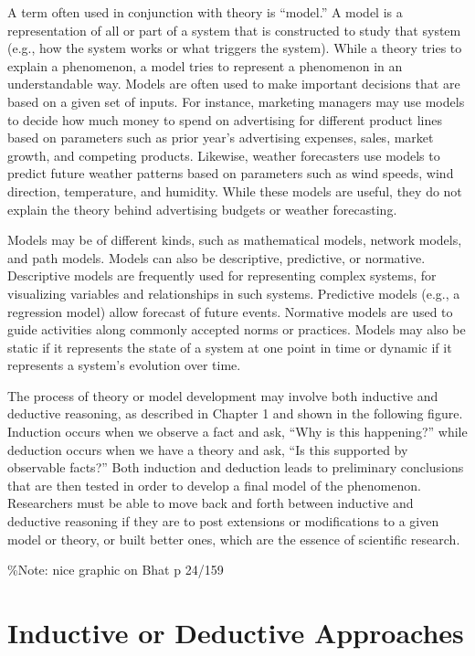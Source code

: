 \documentclass[]{book}
\theoremstyle{definition}
\theoremstyle{definition}
\theoremstyle{definition}
\theoremstyle{remark}
\begin{document}
A term often used in conjunction with theory is ``model.'' A model is a
representation of all or part of a system that is constructed to study
that system (e.g., how the system works or what triggers the system).
While a theory tries to explain a phenomenon, a model tries to represent
a phenomenon in an understandable way. Models are often used to make
important decisions that are based on a given set of inputs. For
instance, marketing managers may use models to decide how much money to
spend on advertising for different product lines based on parameters
such as prior year's advertising expenses, sales, market growth, and
competing products. Likewise, weather forecasters use models to predict
future weather patterns based on parameters such as wind speeds, wind
direction, temperature, and humidity. While these models are useful,
they do not explain the theory behind advertising budgets or weather
forecasting.

Models may be of different kinds, such as mathematical models, network
models, and path models. Models can also be descriptive, predictive, or
normative. Descriptive models are frequently used for representing
complex systems, for visualizing variables and relationships in such
systems. Predictive models (e.g., a regression model) allow forecast of
future events. Normative models are used to guide activities along
commonly accepted norms or practices. Models may also be static if it
represents the state of a system at one point in time or dynamic if it
represents a system's evolution over time.

The process of theory or model development may involve both inductive
and deductive reasoning, as described in Chapter 1 and shown in the
following figure. Induction occurs when we observe a fact and ask, ``Why
is this happening?'' while deduction occurs when we have a theory and
ask, ``Is this supported by observable facts?'' Both induction and
deduction leads to preliminary conclusions that are then tested in order
to develop a final model of the phenomenon. Researchers must be able to
move back and forth between inductive and deductive reasoning if they
are to post extensions or modifications to a given model or theory, or
built better ones, which are the essence of scientific research.

\%Note: nice graphic on Bhat p 24/159

\hypertarget{inductive-or-deductive-approaches}{%
\section{Inductive or Deductive
Approaches}\label{inductive-or-deductive-approaches}}
\end{document}
